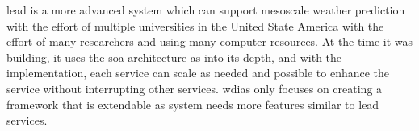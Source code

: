 \acrshort{lead} is a more advanced system which can support mesoscale weather prediction with the effort of multiple universities in the United State America with the effort of many researchers and using many computer resources. At the time it was building, it uses the \acrshort{soa} architecture as into its depth, and with the implementation, each service can scale as needed and possible to enhance the service without interrupting other services. \acrshort{wdias} only focuses on creating a framework that is extendable as system needs more features similar to \acrshort{lead} services.
